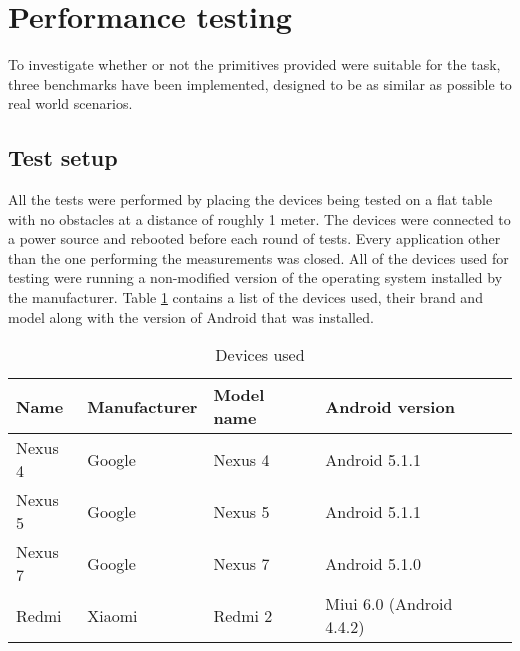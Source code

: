 \section{Performance testing}
To investigate whether or not the primitives provided were suitable for the task, three benchmarks have been implemented, designed to be as similar as possible to real world scenarios.

\subsection{Test setup}
All the tests were performed by placing the devices being tested on a flat table with no obstacles at a distance of roughly 1 meter.
The devices were connected to a power source and rebooted before each round of tests.
Every application other than the one performing the measurements was closed.
All of the devices used for testing were running a non-modified version of the operating system installed by the manufacturer.
Table \ref{table:devices-used} contains a list of the devices used, their brand and model along with the version of Android that was installed.


\begin{table}[h]
\centering
\caption{Devices used}
\label{table:devices-used}
\begin{tabular}{lllll}
\hline
Name          & Manufacturer      & Model name      & Android version           \\ \hline
Nexus 4       & Google            & Nexus 4         & Android 5.1.1             \\
Nexus 5       & Google            & Nexus 5         & Android 5.1.1             \\
Nexus 7       & Google            & Nexus 7         & Android 5.1.0             \\
Redmi         & Xiaomi            & Redmi 2         & Miui 6.0 (Android 4.4.2)  \\ 
\hline
\end{tabular}
\end{table}






